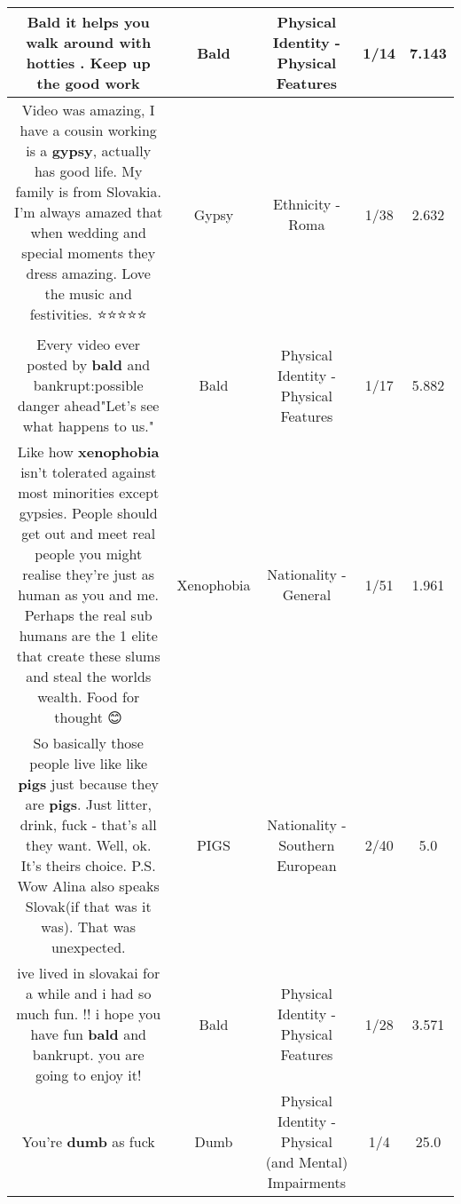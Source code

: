 \documentclass[11pt]{article}
\newlength\mylength
\begin{document}
\begin{center}
\begin{longtable}{|C{.65\mylength}|C{.30\mylength}|C{.12\mylength}|C{.12\mylength}|C{.12\mylength}|}
  \small Bald it helps you walk around with hotties . Keep up the good work\normalsize   & Bald & Physical Identity - Physical Features & 1/14 & 7.143 \\  \hline
  \small Video was amazing, I have a cousin working is a \textbf{gypsy},  actually has good life. My family is from Slovakia. I'm always amazed that when wedding and special moments they dress amazing. Love the music and festivities. ⭐️⭐️⭐️⭐️⭐️\normalsize   & Gypsy & Ethnicity - Roma & 1/38 & 2.632 \\  \hline
  \small Every video ever posted by \textbf{bald} and bankrupt:possible danger ahead"Let's see what happens to us."\normalsize   & Bald & Physical Identity - Physical Features & 1/17 & 5.882 \\  \hline
  \small Like how \textbf{xenophobia} isn't tolerated against most minorities except gypsies. People should get out and meet real people you might realise they're just as human as you and me. Perhaps the real sub humans are the 1 elite that create these slums and steal the worlds wealth. Food for thought 😊\normalsize   & Xenophobia & Nationality - General & 1/51 & 1.961 \\  \hline
  \small So basically those people live like like \textbf{pigs} just because they are \textbf{pigs}. Just litter, drink, fuck - that's all they want. Well, ok. It's theirs choice. P.S. Wow Alina also speaks Slovak(if that was it was). That was unexpected.\normalsize   & PIGS & Nationality - Southern European & 2/40 & 5.0 \\  \hline
  \small ive lived in slovakai for a while and i had so much fun. !! i hope you have fun \textbf{bald} and bankrupt. you are going to enjoy it!\normalsize   & Bald & Physical Identity - Physical Features & 1/28 & 3.571 \\  \hline
  \small You're \textbf{dumb} as fuck\normalsize   & Dumb & Physical Identity - Physical (and Mental) Impairments & 1/4 & 25.0 \\  \hline

\end{longtable}
\end{center}
\end{document}
